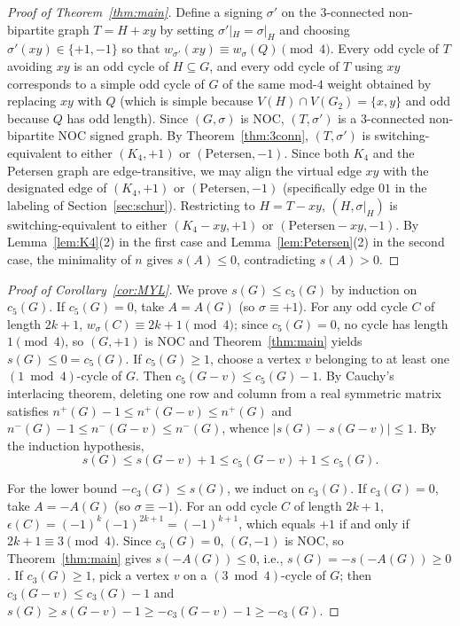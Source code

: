 \documentclass[10pt,letterpaper]{article}
\theoremstyle{zetaplain}
\theoremstyle{zetadef}
\theoremstyle{remark}
\numberwithin{equation}{section}
\begin{document}
\begin{proof}[Proof of Theorem~\ref{thm:main}]
Define a signing $\sigma'$ on the $3$-connected non-bipartite graph $T = H + xy$ by setting $\sigma'|_H = \sigma|_H$ and choosing $\sigma'(xy) \in \{+1, -1\}$ so that $w_{\sigma'}(xy) \equiv w_\sigma(Q) \pmod 4$. Every odd cycle of $T$ avoiding $xy$ is an odd cycle of $H \subseteq G$, and every odd cycle of $T$ using $xy$ corresponds to a simple odd cycle of $G$ of the same mod-$4$ weight obtained by replacing $xy$ with $Q$ (which is simple because $V(H) \cap V(G_2) = \{x, y\}$ and odd because $Q$ has odd length). Since $(G, \sigma)$ is NOC, $(T, \sigma')$ is a $3$-connected non-bipartite NOC signed graph. By Theorem~\ref{thm:3conn}, $(T, \sigma')$ is switching-equivalent to either $(K_4, +1)$ or $(\mathrm{Petersen}, -1)$. Since both $K_4$ and the Petersen graph are edge-transitive, we may align the virtual edge $xy$ with the designated edge of $(K_4, +1)$ or $(\mathrm{Petersen}, -1)$ (specifically edge $01$ in the labeling of Section~\ref{sec:schur}). Restricting to $H = T - xy$, $(H, \sigma|_H)$ is switching-equivalent to either $(K_4 - xy, +1)$ or $(\mathrm{Petersen} - xy, -1)$. By Lemma~\ref{lem:K4}(2) in the first case and Lemma~\ref{lem:Petersen}(2) in the second case, the minimality of $n$ gives $s(A) \le 0$, contradicting $s(A) > 0$.
\end{proof}

\begin{proof}[Proof of Corollary~\ref{cor:MYL}]
We prove $s(G) \le c_5(G)$ by induction on $c_5(G)$. If $c_5(G) = 0$, take $A = A(G)$ (so $\sigma \equiv +1$). For any odd cycle $C$ of length $2k + 1$, $w_\sigma(C) \equiv 2k + 1 \pmod 4$; since $c_5(G) = 0$, no cycle has length $1 \pmod 4$, so $(G, +1)$ is NOC and Theorem~\ref{thm:main} yields $s(G) \le 0 = c_5(G)$. If $c_5(G) \ge 1$, choose a vertex $v$ belonging to at least one $(1 \bmod 4)$-cycle of $G$. Then $c_5(G - v) \le c_5(G) - 1$. By Cauchy's interlacing theorem, deleting one row and column from a real symmetric matrix satisfies $n^+(G) - 1 \le n^+(G - v) \le n^+(G)$ and $n^-(G) - 1 \le n^-(G - v) \le n^-(G)$, whence $|s(G) - s(G - v)| \le 1$. By the induction hypothesis,
\[
  s(G) \le s(G - v) + 1 \le c_5(G - v) + 1 \le c_5(G).
\]

For the lower bound $-c_3(G) \le s(G)$, we induct on $c_3(G)$. If $c_3(G) = 0$, take $A = -A(G)$ (so $\sigma \equiv -1$). For an odd cycle $C$ of length $2k + 1$, $\epsilon(C) = (-1)^k (-1)^{2k+1} = (-1)^{k+1}$, which equals $+1$ if and only if $2k + 1 \equiv 3 \pmod 4$. Since $c_3(G) = 0$, $(G, -1)$ is NOC, so Theorem~\ref{thm:main} gives $s(-A(G)) \le 0$, i.e., $s(G) = -s(-A(G)) \ge 0$. If $c_3(G) \ge 1$, pick a vertex $v$ on a $(3 \bmod 4)$-cycle of $G$; then $c_3(G - v) \le c_3(G) - 1$ and $s(G) \ge s(G - v) - 1 \ge -c_3(G - v) - 1 \ge -c_3(G)$.
\end{proof}
\end{document}
